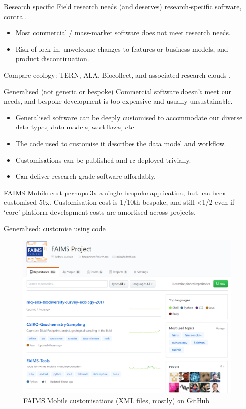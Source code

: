 \documentclass[aspectratio=169, 11pt]{beamer} %
\begin{document}
\begin{frame}{Research specific}
    Field research needs (and deserves) research-specific software, contra \cite{Roosevelt2015-kd}.
      \begin{itemize}[label=\textbullet]
        \item Most commercial / mass-market software does not meet research needs.
        \item Risk of lock-in, unwelcome changes to features or business models, and product discontinuation.
    \end{itemize}
    Compare ecology: TERN, ALA, Biocollect, and associated research clouds \cite{Tern2019-sp, Ala2019-by, Ala2019-cb}.
\end{frame}

\begin{frame}{Generalised (not generic or bespoke)}
  Commercial software doesn't meet our needs, and bespoke development is too expensive and usually unsustainable.
      \begin{itemize}[label=\textbullet]
        \item Generalised software can be deeply customised to accommodate our diverse data types, data models, workflows, etc.
        \item The code used to customise it describes the data model and workflow.
        \item Customisations can be published and re-deployed trivially.
        \item Can deliver research-grade software affordably.  
    \end{itemize}
    FAIMS Mobile cost perhaps 3x a single bespoke application, but has been customised 50x. Customisation cost is 1/10th bespoke, and still <1/2 even if `core' platform development costs are amortised across projects.
\end{frame}

\begin{frame}{Generalised: customise using code}
 \begin{figure}[H]
    \centering
        \includegraphics[height=.75\textheight]{figures/FAIMS-generalised.png}
        \caption{FAIMS Mobile customisations (XML files, mostly) on GitHub}
        \label{fig:figure11}
 \end{figure}
\end{frame}
\end{document}
